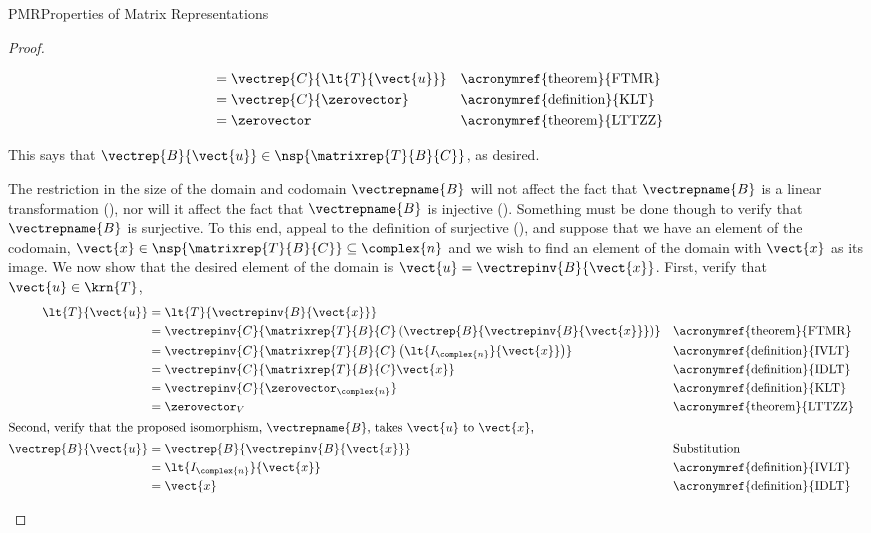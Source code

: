 \begin{subsect}{PMR}{Properties of Matrix Representations}
\begin{proof}
\begin{para}
\begin{align*}
&=\vectrep{C}{\lt{T}{\vect{u}}}&&\text{\acronymref{theorem}{FTMR}}\\
%
&=\vectrep{C}{\zerovector}&&\text{\acronymref{definition}{KLT}}\\
%
&=\zerovector&&\text{\acronymref{theorem}{LTTZZ}}\\
%
\end{align*}
\end{para}
%
\begin{para}This says that $\vectrep{B}{\vect{u}}\in\nsp{\matrixrep{T}{B}{C}}$, as desired.\end{para}
%
\begin{para}The restriction in the size of the domain and codomain $\vectrepname{B}$ will not affect the fact that $\vectrepname{B}$ is a linear transformation (), nor will it affect the fact that $\vectrepname{B}$ is injective ().  Something must be done though to verify that $\vectrepname{B}$ is surjective.  To this end, appeal to the definition of surjective (), and suppose that we have an element of the codomain, $\vect{x}\in\nsp{\matrixrep{T}{B}{C}}\subseteq\complex{n}$ and we wish to find an element of the domain with $\vect{x}$ as its image.  We now show that the desired element of the domain is $\vect{u}=\vectrepinv{B}{\vect{x}}$.  First, verify that $\vect{u}\in\krn{T}$,
%
\begin{align*}
\lt{T}{\vect{u}}
&=\lt{T}{\vectrepinv{B}{\vect{x}}}\\
&=\vectrepinv{C}{\matrixrep{T}{B}{C}\left(\vectrep{B}{\vectrepinv{B}{\vect{x}}}\right)}&&\text{\acronymref{theorem}{FTMR}}\\
&=\vectrepinv{C}{\matrixrep{T}{B}{C}\left(\lt{I_{\complex{n}}}{\vect{x}}\right)}&&\text{\acronymref{definition}{IVLT}}\\
&=\vectrepinv{C}{\matrixrep{T}{B}{C}\vect{x}}&&\text{\acronymref{definition}{IDLT}}\\
&=\vectrepinv{C}{\zerovector_{\complex{n}}}&&\text{\acronymref{definition}{KLT}}\\
&=\zerovector_{V}&&\text{\acronymref{theorem}{LTTZZ}}\\
%
\intertext{Second, verify that the proposed isomorphism, $\vectrepname{B}$, takes $\vect{u}$ to $\vect{x}$,}
%
\vectrep{B}{\vect{u}}&=\vectrep{B}{\vectrepinv{B}{\vect{x}}}&&\text{Substitution}\\
&=\lt{I_{\complex{n}}}{\vect{x}}&&\text{\acronymref{definition}{IVLT}}\\
&=\vect{x}&&\text{\acronymref{definition}{IDLT}}

\end{align*}
\end{para}
\end{proof}
\end{subsect}
